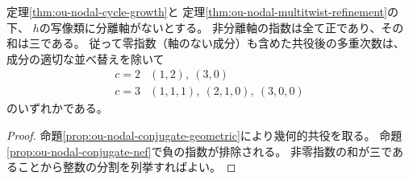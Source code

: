 \begin{corollary}[非分離multitwistの指数の有限リスト]
\label{cor:ou-nodal-positive-exponents}
定理\ref{thm:ou-nodal-cycle-growth}と
定理\ref{thm:ou-nodal-multitwist-refinement}の下、
$h$の写像類に分離軸がないとする。
非分離軸の指数は全て正であり、その和は三である。
従って零指数（軸のない成分）も含めた共役後の多重次数は、
成分の適切な並べ替えを除いて
\[
 \begin{array}{c|l}
 c=2 &(1,2),\ (3,0)\\
 c=3 &(1,1,1),\ (2,1,0),\ (3,0,0)
 \end{array}
\]
のいずれかである。
\end{corollary}
\begin{proof}
命題\ref{prop:ou-nodal-conjugate-geometric}により幾何的共役を取る。
命題\ref{prop:ou-nodal-conjugate-nef}で負の指数が排除される。
非零指数の和が三であることから整数の分割を列挙すればよい。
\end{proof}

